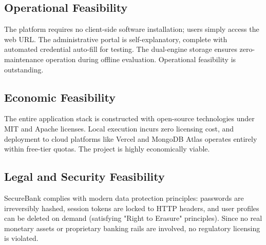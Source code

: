 \subsection{Operational Feasibility}
The platform requires no client-side software installation; users simply access the web URL. The administrative portal is self-explanatory, complete with automated credential auto-fill for testing. The dual-engine storage ensures zero-maintenance operation during offline evaluation. Operational feasibility is outstanding.

\subsection{Economic Feasibility}
The entire application stack is constructed with open-source technologies under MIT and Apache licenses. Local execution incurs zero licensing cost, and deployment to cloud platforms like Vercel and MongoDB Atlas operates entirely within free-tier quotas. The project is highly economically viable.

\subsection{Legal and Security Feasibility}
SecureBank complies with modern data protection principles: passwords are irreversibly hashed, session tokens are locked to HTTP headers, and user profiles can be deleted on demand (satisfying "Right to Erasure" principles). Since no real monetary assets or proprietary banking rails are involved, no regulatory licensing is violated.
